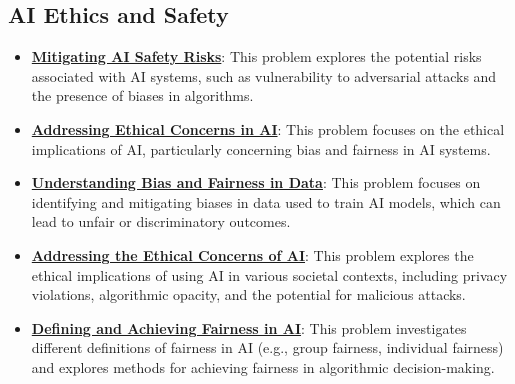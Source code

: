 \documentclass{article}%
\begin{document}
\subsection{AI Ethics and Safety}%
\label{subsec:AIEthicsandSafety}%
\begin{itemize}[leftmargin=*]%
\item \href{https://purdue.brightspace.com/d2l/common/assets/pdfjs-d2l-dist/1.0.14-legacy/web/viewer.html?file=\%2Fcontent\%2Fenforced\%2F1095467-wl.202510.CS.24300.001\%2F02L2-Intro.pdf\%3Fou\%3D1095467\&lang=en-us\&container=d2l-fileviewer-rendered-pdf\&fullscreen=d2l-fileviewer-rendered-pdf-dialog\&height=667#page=19}{\textbf{Mitigating AI Safety Risks}}: This problem explores the potential risks associated with AI systems, such as vulnerability to adversarial attacks and the presence of biases in algorithms.%
\item \href{https://purdue.brightspace.com/d2l/common/assets/pdfjs-d2l-dist/1.0.14-legacy/web/viewer.html?file=\%2Fcontent\%2Fenforced\%2F1095467-wl.202510.CS.24300.001\%2F02L2-Intro.pdf\%3Fou\%3D1095467\&lang=en-us\&container=d2l-fileviewer-rendered-pdf\&fullscreen=d2l-fileviewer-rendered-pdf-dialog\&height=667#page=20}{\textbf{Addressing Ethical Concerns in AI}}: This problem focuses on the ethical implications of AI, particularly concerning bias and fairness in AI systems.%
\item \href{https://purdue.brightspace.com/d2l/common/assets/pdfjs-d2l-dist/1.0.14-legacy/web/viewer.html?file=\%2Fcontent\%2Fenforced\%2F1095467-wl.202510.CS.24300.001\%2F16L2-ethics.pdf\%3Fou\%3D1095467\&lang=en-us\&container=d2l-fileviewer-rendered-pdf\&fullscreen=d2l-fileviewer-rendered-pdf-dialog\&height=667#page=2}{\textbf{Understanding Bias and Fairness in Data}}: This problem focuses on identifying and mitigating biases in data used to train AI models, which can lead to unfair or discriminatory outcomes.%
\item \href{https://purdue.brightspace.com/d2l/common/assets/pdfjs-d2l-dist/1.0.14-legacy/web/viewer.html?file=\%2Fcontent\%2Fenforced\%2F1095467-wl.202510.CS.24300.001\%2F16L2-ethics.pdf\%3Fou\%3D1095467\&lang=en-us\&container=d2l-fileviewer-rendered-pdf\&fullscreen=d2l-fileviewer-rendered-pdf-dialog\&height=667#page=2}{\textbf{Addressing the Ethical Concerns of AI}}: This problem explores the ethical implications of using AI in various societal contexts, including privacy violations, algorithmic opacity, and the potential for malicious attacks.%
\item \href{https://purdue.brightspace.com/d2l/common/assets/pdfjs-d2l-dist/1.0.14-legacy/web/viewer.html?file=\%2Fcontent\%2Fenforced\%2F1095467-wl.202510.CS.24300.001\%2F16L2-ethics.pdf\%3Fou\%3D1095467\&lang=en-us\&container=d2l-fileviewer-rendered-pdf\&fullscreen=d2l-fileviewer-rendered-pdf-dialog\&height=667#page=19}{\textbf{Defining and Achieving Fairness in AI}}: This problem investigates different definitions of fairness in AI (e.g., group fairness, individual fairness) and explores methods for achieving fairness in algorithmic decision-making.%

\end{itemize}
\end{document}
